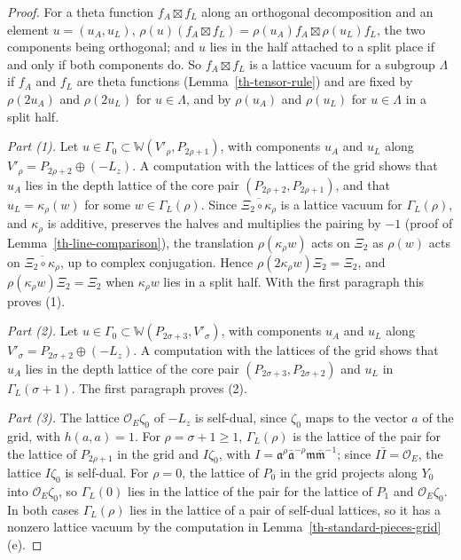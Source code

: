 \begin{proof}
For a theta function $f_A\boxtimes f_L$ along an orthogonal decomposition and an
element $u=(u_A,u_L)$, $\rho(u)(f_A\boxtimes f_L)=\rho(u_A)f_A\boxtimes\rho(u_L)f_L$,
the two components being orthogonal; and $u$ lies in the half attached to a split
place if and only if both components do. So $f_A\boxtimes f_L$ is a lattice
vacuum for a subgroup $\Lambda$ if $f_A$ and $f_L$ are theta functions
(Lemma~\ref{th-tensor-rule}) and are fixed by $\rho(2u_A)$ and $\rho(2u_L)$ for
$u\in\Lambda$, and by $\rho(u_A)$ and $\rho(u_L)$ for $u\in\Lambda$ in a split
half.

\emph{Part (1).} Let $u\in\Gamma_0\subset\mathbb W(V'_\rho,P_{2\rho+1})$, with
components $u_A$ and $u_L$ along $V'_\rho=P_{2\rho+2}\oplus(-L_z)$. A computation
with the lattices of the grid shows that $u_A$ lies in the depth lattice of the
core pair $(P_{2\rho+2},P_{2\rho+1})$, and that $u_L=\kappa_\rho(w)$ for some
$w\in\Gamma_L(\rho)$. Since $\overline{\Xi_2\circ\kappa_\rho}$ is a lattice vacuum
for $\Gamma_L(\rho)$, and $\kappa_\rho$ is additive, preserves the halves and
multiplies the pairing by $-1$ (proof of Lemma~\ref{th-line-comparison}), the
translation $\rho(\kappa_\rho w)$ acts on $\Xi_2$ as $\rho(w)$ acts on
$\overline{\Xi_2\circ\kappa_\rho}$, up to complex conjugation. Hence
$\rho(2\kappa_\rho w)\Xi_2=\Xi_2$, and $\rho(\kappa_\rho w)\Xi_2=\Xi_2$ when
$\kappa_\rho w$ lies in a split half. With the first paragraph this proves (1).

\emph{Part (2).} Let $u\in\Gamma_0\subset\mathbb W(P_{2\sigma+3},V'_\sigma)$, with
components $u_A$ and $u_L$ along $V'_\sigma=P_{2\sigma+2}\oplus(-L_z)$. A
computation with the lattices of the grid shows that $u_A$ lies in the depth
lattice of the core pair $(P_{2\sigma+3},P_{2\sigma+2})$ and $u_L$ in
$\Gamma_L(\sigma+1)$. The first paragraph proves (2).

\emph{Part (3).} The lattice $\mathcal O_E\zeta_0$ of $-L_z$ is self-dual, since
$\zeta_0$ maps to the vector $a$ of the grid, with $h(a,a)=1$. For
$\rho=\sigma+1\geq1$, $\Gamma_L(\rho)$ is the lattice of the pair for the lattice
of $P_{2\rho+1}$ in the grid and $I\zeta_0$, with
$I=\mathfrak a^\rho\bar{\mathfrak a}^{-\rho}\mathfrak m\bar{\mathfrak m}^{-1}$;
since $I\bar I=\mathcal O_E$, the lattice $I\zeta_0$ is self-dual. For $\rho=0$,
the lattice of $P_0$ in the grid projects along $Y_0$ into $\mathcal O_E\zeta_0$,
so $\Gamma_L(0)$ lies in the lattice of the pair for the lattice of $P_1$ and
$\mathcal O_E\zeta_0$. In both cases $\Gamma_L(\rho)$ lies in the lattice of a
pair of self-dual lattices, so it has a nonzero lattice vacuum by the computation
in Lemma~\ref{th-standard-pieces-grid}(e).


\end{proof}
